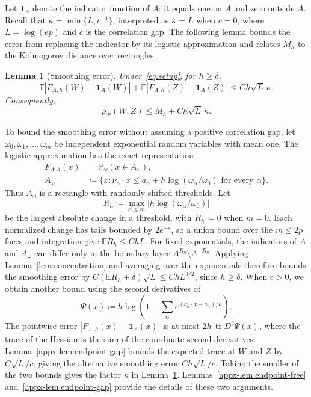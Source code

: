 \documentclass[11pt,letterpaper]{article}
\newtheorem{lemma}{Lemma}
\theoremstyle{remark}
\newcommand{\E}{\mathbb E}
\newcommand{\Pp}{\mathbb P}
\newcommand{\tr}{\operatorname{tr}}
\newcommand{\rh}{\rho_{\mathcal R}}
\newcommand{\ind}{\mathbf 1}
\begin{document}
Let \(\ind_A\) denote the indicator function of \(A\): it equals one
on \(A\) and zero outside \(A\). Recall that
\(\kappa=\min\{L,c^{-1}\}\), interpreted as \(\kappa=L\) when
\(c=0\), where \(L=\log(ep)\) and \(c\) is the correlation gap.
The following lemma bounds the error from replacing the indicator by
its logistic approximation and relates \(M_h\) to the Kolmogorov
distance over rectangles.

\begin{lemma}[Smoothing error]\label{lem:endpoint}
Under~\eqref{eq:setup}, for \(h\ge\delta\),
\begin{equation}
 \E|F_{A,h}(W)-\ind_A(W)|+
 \E|F_{A,h}(Z)-\ind_A(Z)|\le Ch\sqrt L\,\kappa.
 \label{eq:endpoint-error}
\end{equation}
Consequently,
\begin{equation}
 \rh(W,Z)\le M_h+Ch\sqrt L\,\kappa.
 \label{eq:endpoint-min}
\end{equation}
\end{lemma}

To bound the smoothing error without assuming a positive correlation
gap, let \(\omega_0,\omega_1,\ldots,\omega_m\) be independent
exponential random variables with mean one. The logistic approximation
has the exact representation
\begin{equation}
 \begin{split}
 F_{A,h}(x)&=\Pp_\omega(x\in A_\omega),\\
 A_\omega&\coloneqq \{x:\nu_\alpha\cdot x\le
 a_\alpha+h\log(\omega_\alpha/\omega_0)
 \text{ for every }\alpha\}.
 \end{split}
 \label{eq:mixture}
\end{equation}
Thus \(A_\omega\) is a rectangle with randomly shifted thresholds.
Let
\[
 R_h\coloneqq \max_{\alpha\le m}
       |h\log(\omega_\alpha/\omega_0)|
\]
be the largest absolute change in a threshold, with \(R_h\coloneqq 0\) when
\(m=0\). Each normalized change has tails bounded by \(2e^{-s}\),
so a union bound over the \(m\le2p\) faces and integration give
\(\E R_h\le ChL\). For fixed exponentials, the indicators of \(A\)
and \(A_\omega\) can differ only in the boundary layer
\(A^{R_h}\setminus A^{-R_h}\). Applying
Lemma~\ref{lem:concentration} and averaging over the exponentials
therefore bounds the smoothing error by
\(C(\E R_h+\delta)\sqrt L\le ChL^{3/2}\), since \(h\ge\delta\).
When \(c>0\), we obtain another bound using the second derivatives of
\[
 \Psi(x)\coloneqq h\log\!\left(1+\sum_\alpha
              e^{(\nu_\alpha\cdot x-a_\alpha)/h}\right).
\]
The pointwise error \(|F_{A,h}(x)-\ind_A(x)|\) is at most
\(2h\,\tr D^2\Psi(x)\), where the trace of the Hessian is the sum
of the coordinate second derivatives.
Lemma~\ref{appx-lem:endpoint-gap} bounds the expected trace at \(W\)
and \(Z\) by \(C\sqrt L/c\), giving the alternative smoothing
error \(Ch\sqrt L/c\). Taking the smaller of the two bounds gives
the factor \(\kappa\) in Lemma~\ref{lem:endpoint}.
Lemmas~\ref{appx-lem:endpoint-free} and~\ref{appx-lem:endpoint-gap}
provide the details of these two arguments.
\end{document}
